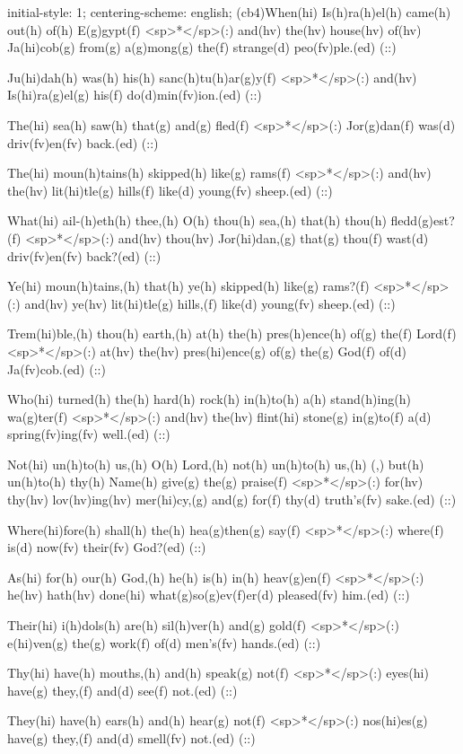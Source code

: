 initial-style: 1;
centering-scheme: english;
(cb4)When(hi) Is(h)ra(h)el(h) came(h) out(h) of(h) E(g)gypt(f) <sp>*</sp>(:) and(hv) the(hv) house(hv) of(hv) Ja(hi)cob(g) from(g) a(g)mong(g) the(f) strange(d) peo(fv)ple.(ed) (::)

Ju(hi)dah(h) was(h) his(h) sanc(h)tu(h)ar(g)y(f) <sp>*</sp>(:) and(hv) Is(hi)ra(g)el(g) his(f) do(d)min(fv)ion.(ed) (::)

The(hi) sea(h) saw(h) that(g) and(g) fled(f) <sp>*</sp>(:) Jor(g)dan(f) was(d) driv(fv)en(fv) back.(ed) (::)

The(hi) moun(h)tains(h) skipped(h) like(g) rams(f) <sp>*</sp>(:) and(hv) the(hv) lit(hi)tle(g) hills(f) like(d) young(fv) sheep.(ed) (::)

What(hi) ail-(h)eth(h) thee,(h) O(h) thou(h) sea,(h) that(h) thou(h) fledd(g)est?(f) <sp>*</sp>(:) and(hv) thou(hv) Jor(hi)dan,(g) that(g) thou(f) wast(d) driv(fv)en(fv) back?(ed) (::)

Ye(hi) moun(h)tains,(h) that(h) ye(h) skipped(h) like(g) rams?(f) <sp>*</sp>(:) and(hv) ye(hv) lit(hi)tle(g) hills,(f) like(d) young(fv) sheep.(ed) (::)

Trem(hi)ble,(h) thou(h) earth,(h) at(h) the(h) pres(h)ence(h) of(g) the(f) Lord(f) <sp>*</sp>(:) at(hv) the(hv) pres(hi)ence(g) of(g) the(g) God(f) of(d) Ja(fv)cob.(ed) (::)

Who(hi) turned(h) the(h) hard(h) rock(h) in(h)to(h) a(h) stand(h)ing(h) wa(g)ter(f) <sp>*</sp>(:) and(hv) the(hv) flint(hi) stone(g) in(g)to(f) a(d) spring(fv)ing(fv) well.(ed) (::)

Not(hi) un(h)to(h) us,(h) O(h) Lord,(h) not(h) un(h)to(h) us,(h) (,) but(h) un(h)to(h) thy(h) Name(h) give(g) the(g) praise(f) <sp>*</sp>(:) for(hv) thy(hv) lov(hv)ing(hv) mer(hi)cy,(g) and(g) for(f) thy(d) truth's(fv) sake.(ed) (::)

Where(hi)fore(h) shall(h) the(h) hea(g)then(g) say(f) <sp>*</sp>(:) where(f) is(d) now(fv) their(fv) God?(ed) (::)

As(hi) for(h) our(h) God,(h) he(h) is(h) in(h) heav(g)en(f) <sp>*</sp>(:) he(hv) hath(hv) done(hi) what(g)so(g)ev(f)er(d) pleased(fv) him.(ed) (::)

Their(hi) i(h)dols(h) are(h) sil(h)ver(h) and(g) gold(f) <sp>*</sp>(:)  e(hi)ven(g) the(g) work(f) of(d) men's(fv) hands.(ed) (::)

Thy(hi) have(h) mouths,(h) and(h) speak(g) not(f) <sp>*</sp>(:) eyes(hi) have(g) they,(f) and(d) see(f) not.(ed) (::)

They(hi) have(h) ears(h) and(h) hear(g) not(f) <sp>*</sp>(:) nos(hi)es(g) have(g) they,(f) and(d) smell(fv) not.(ed) (::)

